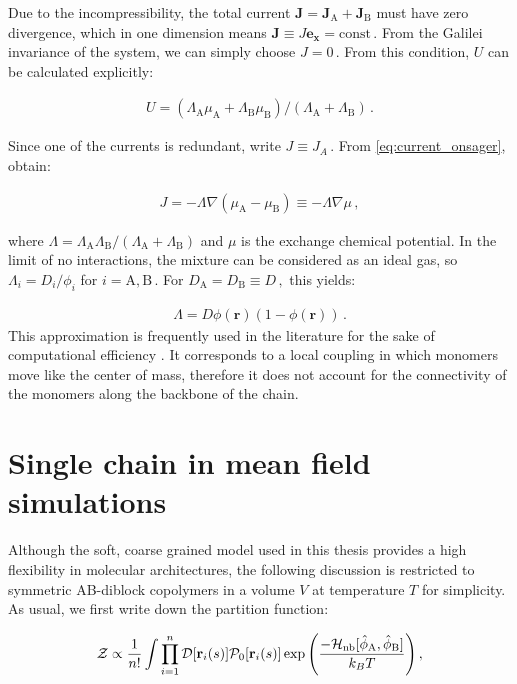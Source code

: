 \documentclass[bachelor,       %
               twoside,        %
               BCOR10mm,       %
               ngerman, english %
               ]{GAUBM}
\begin{document}
Due to the incompressibility, the total current $\mathbf J=\mathbf{J}_\mathrm A+\mathbf{J}_\mathrm B$ must have zero divergence, which in one dimension means $\mathbf J\equiv J\mathbf{e_x}=\mathrm{const}\,.$ From the Galilei invariance of the system, we can simply choose $J=0\,.$ From this condition, $U$ can be calculated explicitly:

\begin{align}
  U=(\Lambda_\mathrm A\mu_\mathrm A+\Lambda_\mathrm B\mu_\mathrm B)/(\Lambda_\mathrm A+\Lambda_\mathrm B)\,.
\end{align}

Since one of the currents is redundant, write $J\equiv J_A\,.$ From \eqref{eq:current_onsager}, obtain:

\begin{align}
  J=-\Lambda\nabla(\mu_\mathrm A - \mu_\mathrm B)\equiv -\Lambda\nabla\mu\,,
\end{align}

where $\Lambda=\Lambda_\mathrm A\Lambda_\mathrm B/(\Lambda_\mathrm A+\Lambda_\mathrm B)$ and $\mu$ is the exchange chemical potential. In the limit of no interactions, the mixture can be considered as an ideal gas, so $\Lambda_i=D_i/\phi_i$ for $i=\mathrm A, \mathrm B\,.$ For $D_\mathrm A=D_\mathrm B\equiv D\,,$ this yields:

\begin{align}
  \Lambda=D\phi(\mathbf{r})(1-\phi(\mathbf{r}))\,.
  \label{eq:onsager}
\end{align}
This approximation is frequently used in the literature for the sake of computational efficiency \cite{Fraaje97,deGennes80,Binder83}. It corresponds to a local coupling in which monomers move like the center of mass, therefore it does not account for the connectivity of the monomers along the backbone of the chain. 

\section{Single chain in mean field simulations}



Although the soft, coarse grained model used in this thesis provides a high flexibility in molecular architectures, the following discussion is restricted to symmetric  AB-diblock copolymers in a volume $V$ at temperature $T$ for simplicity. As usual, we first write down the partition function:

\begin{align}
    \mathcal{Z}\propto\frac{1}{n!}\int{\prod_{i=1}^n\mathcal{D}[\mathbf r_i(s)]\mathcal P_0[\mathbf r_i(s)]\exp\left(\frac{-\mathcal H_{\text{nb}}[\hat\phi_\text A,\hat\phi_\text B]}{k_BT}\right)}\,,
    \label{eq:partition_function}
\end{align}
\end{document}

